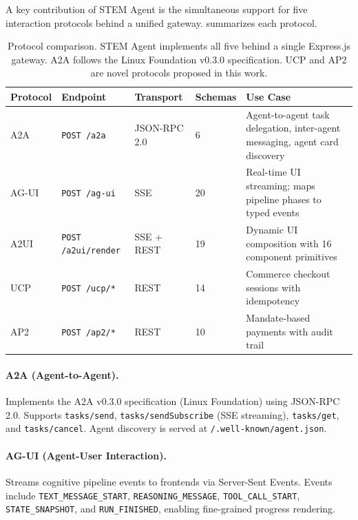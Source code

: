 \documentclass{article}
\begin{document}
A key contribution of STEM Agent is the simultaneous support for five interaction protocols behind a unified gateway.  summarizes each protocol.

\begin{table}[t]
  \caption{Protocol comparison. STEM Agent implements all five behind a single Express.js gateway. A2A follows the Linux Foundation v0.3.0 specification. UCP and AP2 are novel protocols proposed in this work.}
  \label{tab:protocols}
  \begin{center}
    \begin{small}
      \begin{tabular}{llllp{5.5cm}}
        \toprule
        Protocol & Endpoint & Transport & Schemas & Use Case \\
        \midrule
        A2A & \texttt{POST /a2a} & JSON-RPC 2.0 & 6 & Agent-to-agent task delegation, inter-agent messaging, agent card discovery \\
        AG-UI & \texttt{POST /ag-ui} & SSE & 20 & Real-time UI streaming; maps pipeline phases to typed events \\
        A2UI & \texttt{POST /a2ui/render} & SSE + REST & 19 & Dynamic UI composition with 16 component primitives \\
        UCP & \texttt{POST /ucp/*} & REST & 14 & Commerce checkout sessions with idempotency \\
        AP2 & \texttt{POST /ap2/*} & REST & 10 & Mandate-based payments with audit trail \\
        \bottomrule
      \end{tabular}
    \end{small}
  \end{center}
  \vskip -0.1in
\end{table}

\paragraph{A2A (Agent-to-Agent).} Implements the A2A v0.3.0 specification (Linux Foundation) using JSON-RPC 2.0. Supports \texttt{tasks/send}, \texttt{tasks/sendSubscribe} (SSE streaming), \texttt{tasks/get}, and \texttt{tasks/cancel}. Agent discovery is served at \texttt{/.well-known/agent.json}.

\paragraph{AG-UI (Agent-User Interaction).} Streams cognitive pipeline events to frontends via Server-Sent Events. Events include \texttt{TEXT\_MESSAGE\_START}, \texttt{REASONING\_MESSAGE}, \texttt{TOOL\_CALL\_START}, \texttt{STATE\_SNAPSHOT}, and \texttt{RUN\_FINISHED}, enabling fine-grained progress rendering.
\end{document}
